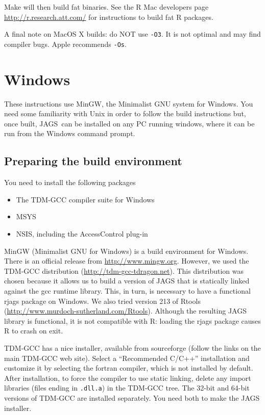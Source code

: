 \documentclass[11pt, a4paper, titlepage]{article}
\newcommand{\JAGS}{\textsf{JAGS}}
\begin{document}
Make will then build fat binaries.  See the R Mac developers page 
\url{http://r.research.att.com/} for instructions to build fat R packages.

A final note on MacOS X builds: do NOT use \texttt{-O3}.  It is not optimal 
and may find compiler bugs.  Apple recommends \texttt{-Os}.

\clearpage
\section{Windows}
\label{section:windows}

These instructions use MinGW, the Minimalist GNU system for Windows.
You need some familiarity with Unix in order to follow the build
instructions but, once built, \JAGS\ can be installed on any PC
running windows, where it can be run from the Windows command prompt.

\subsection{Preparing the build environment}

You need to install the following packages
\begin{itemize}
\item The TDM-GCC compiler suite for Windows
\item MSYS  
\item NSIS, including the AccessControl plug-in  
\end{itemize}

MinGW (Minimalist GNU for Windows) is a build environment for Windows.
There is an official release from \url{http://www.mingw.org}.
However, we used the TDM-GCC distribution
(\url{http://tdm-gcc-tdragon.net}).  This distribution was chosen
because it allows us to build a version of JAGS that is statically
linked against the gcc runtime library.  This, in turn, is necessary
to have a functional rjags package on Windows.  We also tried version
213 of Rtools
(\url{http://www.murdoch-sutherland.com/Rtools}). Although the
resulting JAGS library is functional, it is not compatible with R:
loading the rjags package causes R to crash on exit.

TDM-GCC has a nice installer, available from sourceforge (follow the
links on the main TDM-GCC web site). Select a ``Recommended C/C++''
installation and customize it by selecting the fortran compiler, which
is not installed by default. After installation, to force the compiler
to use static linking, delete any import libraries (files ending in
\verb+.dll.a+) in the TDM-GCC tree.  The 32-bit and 64-bit versions
of TDM-GCC are installed separately. You need both to make the JAGS
installer.
\end{document}
